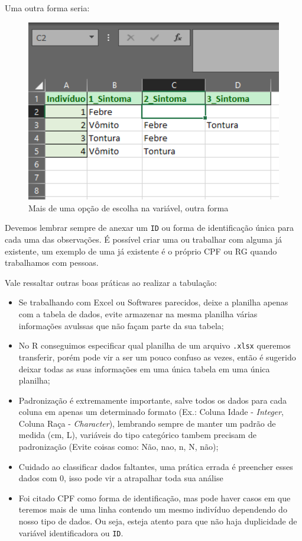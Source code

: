 \documentclass[
  letterpaper,
  DIV=11,
  numbers=noendperiod]{scrreprt}
\begin{document}
Uma outra forma seria:

\begin{figure}

{\centering \includegraphics[width=1\textwidth,height=\textheight]{./figuras_tabulacao/excel3.png}

}

\caption{Mais de uma opção de escolha na variável, outra forma}

\end{figure}

Devemos lembrar sempre de anexar um \texttt{ID} ou forma de
identificação única para cada uma das observações. É possível criar uma
ou trabalhar com alguma já existente, um exemplo de uma já existente é o
próprio CPF ou RG quando trabalhamos com pessoas.

Vale ressaltar outras boas práticas ao realizar a tabulação:

\begin{itemize}
\item
  Se trabalhando com Excel ou Softwares parecidos, deixe a planilha
  apenas com a tabela de dados, evite armazenar na mesma planilha várias
  informações avulssas que não façam parte da sua tabela;
\item
  No R conseguimos especificar qual planilha de um arquivo
  \texttt{.xlsx} queremos transferir, porém pode vir a ser um pouco
  confuso as vezes, então é sugerido deixar todas as suas informações em
  uma única tabela em uma única planilha;
\item
  Padronização é extremamente importante, salve todos os dados para cada
  coluna em apenas um determinado formato (Ex.: Coluna Idade -
  \emph{Integer}, Coluna Raça - \emph{Character}), lembrando sempre de
  manter um padrão de medida (cm, L), variáveis do tipo categórico
  tambem precisam de padronização (Evite coisas como: Não, nao, n, N,
  não);
\item
  Cuidado ao classificar dados faltantes, uma prática errada é preencher
  esses dados com 0, isso pode vir a atrapalhar toda sua análise
\item
  Foi citado CPF como forma de identificação, mas pode haver casos em
  que teremos mais de uma linha contendo um mesmo indivíduo dependendo
  do nosso tipo de dados. Ou seja, esteja atento para que não haja
  duplicidade de variável identificadora ou \texttt{ID}.
\end{itemize}
\end{document}
